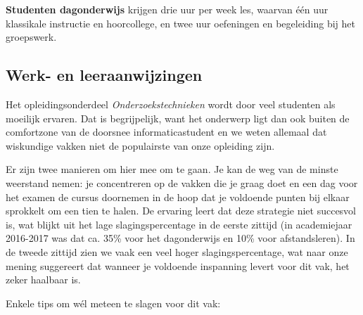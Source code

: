 \textbf{Studenten dagonderwijs} krijgen drie uur per week les, waarvan één uur klassikale instructie en hoorcollege, en twee uur oefeningen en begeleiding bij het groepswerk.

\subsection{Werk- en leeraanwijzingen}

Het opleidingsonderdeel \emph{Onderzoekstechnieken} wordt door veel studenten als moeilijk ervaren. Dat is begrijpelijk, want het onderwerp ligt dan ook buiten de comfortzone van de doorsnee informaticastudent en we weten allemaal dat wiskundige vakken niet de populairste van onze opleiding zijn.

Er zijn twee manieren om hier mee om te gaan. Je kan de weg van de minste weerstand nemen: je concentreren op de vakken die je graag doet en een dag voor het examen de cursus doornemen in de hoop dat je voldoende punten bij elkaar sprokkelt om een tien te halen. De ervaring leert dat deze strategie niet succesvol is, wat blijkt uit het lage slagingspercentage in de eerste zittijd (in academiejaar 2016-2017 was dat ca. 35\% voor het dagonderwijs en 10\% voor afstandsleren). In de tweede zittijd zien we vaak een veel hoger slagingspercentage, wat naar onze mening suggereert dat wanneer je voldoende inspanning levert voor dit vak, het zeker haalbaar is.

Enkele tips om w\'el meteen te slagen voor dit vak:

